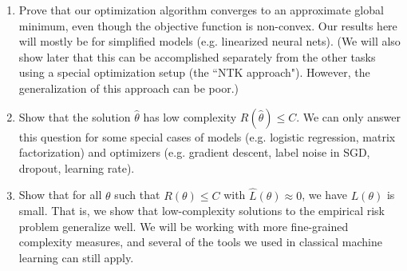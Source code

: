 \begin{enumerate}
    \item Prove that our optimization algorithm converges to an approximate global minimum, even though the objective function is non-convex. Our results here will mostly be for simplified models (e.g. linearized neural nets). (We will also show later that this can be accomplished separately from the other tasks using a special optimization setup (the ``NTK approach"). However, the generalization of this approach can be poor.)
    
    \item Show that the solution $\hat{\theta}$ has low complexity $R(\hat{\theta})\leq C$. We can only answer this question for some special cases of models (e.g. logistic regression, matrix factorization) and optimizers (e.g. gradient descent, label noise in SGD, dropout, learning rate).
    
    \item Show that for all $\theta$ such that $R(\theta)\leq C$ with $\hat{L}(\theta)\approx 0$, we have $L(\theta)$ is small. That is, we show that low-complexity solutions to the empirical risk problem generalize well. We will be working with more fine-grained complexity measures, and several of the tools we used in classical machine learning can still apply.
\end{enumerate}